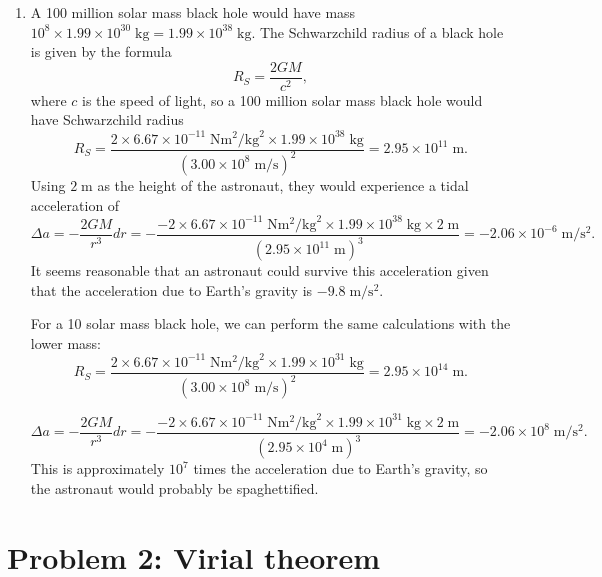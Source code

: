 \documentclass[11pt,letterpaper]{article}
\begin{document}
\begin{enumerate}[label=(\alph*)]
    \item
    A 100 million solar mass black hole would have mass $10^8\times 1.99\times 10^{30}\;\si{\kg} = 1.99\times 10^{38}\;\si{\kg}.$
    The Schwarzchild radius of a black hole is given by the formula $$R_S = \frac{2GM}{c^2},$$ where $c$ is the speed of light, so a 100 million solar mass black hole would have Schwarzchild radius $$R_S = \frac{2\times 6.67\times 10^{-11}\;\si{\newton\square\meter\per\square\kg}\times 1.99\times 10^{38}\;\si{\kg}}{(3.00\times 10^8\;\si{\meter\per\second})^2} = 2.95\times 10^{11}\;\si{\meter}.$$ Using $2\;\si{\meter}$ as the height of the astronaut, they would experience a tidal acceleration of $$\Delta a = -\frac{2GM}{r^3}dr = -\frac{-2\times 6.67\times 10^{-11}\;\si{\newton\square\meter\per\square\kg}\times 1.99\times 10^{38}\;\si{\kg}\times 2\;\si{\meter}}{(2.95\times 10^{11}\;\si{\meter})^3} = -2.06\times 10^{-6}\;\si{\meter\per\square\second}.$$ It seems reasonable that an astronaut could survive this acceleration given that the acceleration due to Earth's gravity is $-9.8\;\si{\meter\per\square\second}.$ 
    
    For a 10 solar mass black hole, we can perform the same calculations with the lower mass: $$R_S = \frac{2\times 6.67\times 10^{-11}\;\si{\newton\square\meter\per\square\kg}\times 1.99\times 10^{31}\;\si{\kg}}{(3.00\times 10^8\;\si{\meter\per\second})^2} = 2.95\times 10^{14}\;\si{\meter}.$$
    
    $$\Delta a = -\frac{2GM}{r^3}dr = -\frac{-2\times 6.67\times 10^{-11}\;\si{\newton\square\meter\per\square\kg}\times 1.99\times 10^{31}\;\si{\kg}\times 2\;\si{\meter}}{(2.95\times 10^4\;\si{\meter})^3} = -2.06\times 10^8\;\si{\meter\per\square\second}.$$ This is approximately $10^7$ times the acceleration due to Earth's gravity, so the astronaut would probably be spaghettified. 
    

\end{enumerate}

\section*{Problem 2: Virial theorem}
\end{document}
